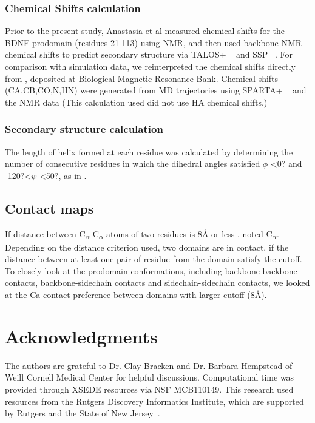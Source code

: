 \documentclass[journal=jacsat,manuscript=article]{achemso}
\begin{document}
\subsubsection*{Chemical Shifts calculation}  Prior to the present study, Anastasia et al\cite{Anastasia2013} measured chemical shifts for the BDNF prodomain (residues 21-113) using NMR, and then used backbone NMR chemical shifts to predict secondary structure via TALOS+ ~\cite{Shen2009} and SSP ~\cite{Marsh2006a}. For comparison with simulation data, we reinterpreted the chemical shifts directly from \cite{Anastasia2013}, deposited at Biological Magnetic Resonance Bank. Chemical shifts (CA,CB,CO,N,HN) were generated from MD trajectories using SPARTA+ ~\cite{Shen2010} and the NMR data (This calculation used did not use HA chemical shifts.)  


\subsubsection*{Secondary structure calculation} The length of helix formed at each residue was calculated by determining the number of consecutive residues in which the dihedral angles satisfied $\phi$ \textless 0? and -120?\textless $\psi$ \textless 50?, as in \cite{Nodet,Iglesias2013}.


\subsection*{Contact maps} If distance between C\textsubscript{$\alpha$}-C\textsubscript{$\alpha$} atoms of two residues is 8{\AA} or less , noted C\textsubscript{$\alpha$}. Depending on the distance criterion used, two domains are in contact, if the distance between at-least one pair of residue from the domain satisfy the cutoff. To closely look at the prodomain conformations, including backbone-backbone contacts, backbone-sidechain contacts and sidechain-sidechain contacts, we looked at the Ca contact preference between domains with larger cutoff (8\AA). 



\section*{Acknowledgments}
The authors are grateful to Dr. Clay Bracken and Dr. Barbara Hempstead of Weill Cornell Medical Center for helpful discussions. Computational time was provided through XSEDE resources via NSF MCB110149. This research used resources from the Rutgers Discovery Informatics Institute, which are supported by Rutgers and the State of New Jersey~\cite{Parashar2018}.
\end{document}
